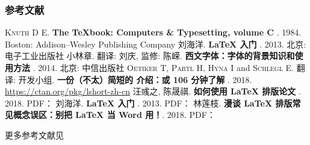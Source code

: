 \begin{frame}[fragile]
\frametitle{参考文献}
\tiny
\newcommand\BOOK[1]{\textbf{#1}}
\newcommand\TAG[1]{\CASE{[#1]}}
\begin{thebibliography}{99}
  \bibitem{}
    \textsc{Knuth D E}.
    \newblock \BOOK{The \TeX book: Computers \& Typesetting, volume C} \TAG{M}. 1984.
    \newblock Boston: Addison--Wesley Publishing Company
  \bibitem{}
    刘海洋.
    \newblock \BOOK{\LaTeX{} 入门} \TAG{M}. 2013.
    \newblock 北京: 电子工业出版社
  \bibitem{}
    {小林章}. 翻译: 刘庆, 监修: 陈嵘.
    \newblock \BOOK{西文字体：字体的背景知识和使用方法} \TAG{M}. 2014.
    \newblock 北京: 中信出版社
  \bibitem{}
    \textsc{Oetiker T}, \textsc{Partl H}, \textsc{Hyna I} and \textsc{Schlegl E}.
    翻译: \CTeX{} 开发小组.
    \newblock \BOOK{一份（不太）简短的 \LaTeXe{} 介绍：或 106 分钟了解 \LaTeXe{}} \TAG{EB/OL}. 2018.
    \newblock \url{https://ctan.org/pkg/lshort-zh-cn}
  \bibitem{}
    汪彧之, 陈晟祺.
    \newblock \BOOK{如何使用 \LaTeX{} 排版论文} \TAG{EB/OL}. 2018.
    \newblock PDF：
      \href{https://github.com/tuna/thulib-latex-talk/raw/master/latex-talk.pdf}{\faDownload}
  \bibitem{}
    刘海洋.
    \newblock \BOOK{\LaTeX{} 入门} \TAG{EB/OL}. 2013.
    \newblock PDF：
      \href{https://bbs.pku.edu.cn/attach/e7/f2/e7f2bb698b9c3672/tex_intro_talk.pdf}{\faDownload}
  \bibitem{}
    林莲枝.
    \newblock \BOOK{漫谈 \LaTeX{} 排版常见概念误区：别把 \LaTeX{} 当 Word 用！}\TAG{EB/OL}. 2018.
    \newblock PDF：
      \href{http://static.latexstudio.net/wp-content/uploads/2018/03/LianTze-presentation-0320-forReading.pdf}{\faDownload}
\end{thebibliography}
更多参考文献见 %
\vspace{-0.5cm}
\end{frame}
